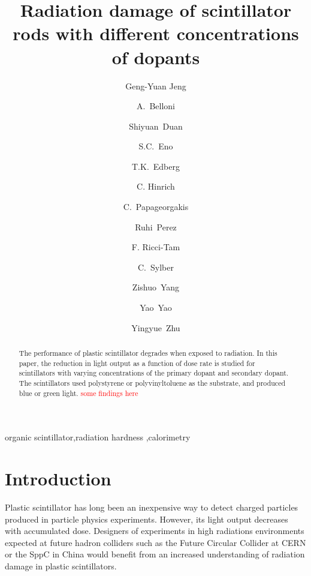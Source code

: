 \documentclass[review]{elsarticle}
\begin{document}
\begin{frontmatter}

\title{Radiation damage of scintillator rods with different concentrations of dopants
}


\author[umd]{Geng-Yuan Jeng}
\author[umd]{A.~Belloni}
\author[umd]{Shiyuan~Duan}
\author[umd]{S.C.~Eno}
\author[umd]{T.K.~Edberg}
\author[umd]{C. Hinrich}
\author[umd]{C.~Papageorgakis}
\author[umd]{Ruhi~Perez}
\author[umd]{F. Ricci-Tam}
\author[umd]{C.~Sylber}
\author[umd]{Zishuo~Yang}
\author[umd]{Yao~Yao}
\author[umd]{Yingyue~Zhu}

\address[umd]{Dept. Physics, U. Maryland, College Park MD 30742 USA}



\begin{abstract}
The performance of plastic scintillator degrades when exposed to radiation. 
In this paper, the reduction in light output  as a function of dose rate
is studied for scintillators
with varying concentrations of the primary dopant and secondary dopant.
The scintillators used polystyrene or polyvinyltoluene as the substrate, and
produced blue or green light. \textcolor{red}{some findings here}
\end{abstract}

\begin{keyword}
organic scintillator\sep radiation hardness \sep calorimetry
\end{keyword}

\end{frontmatter}

\linenumbers

\section{Introduction}
Plastic scintillator has long been an inexpensive way to detect 
charged particles produced in particle physics experiments.  
However, its 
light output decreases with accumulated dose.  
Designers of experiments in high radiations environments expected
at future hadron colliders such as the Future Circular Collider at CERN\cite{fcc}
or the SppC in China\cite{sppc}
would benefit from an increased understanding
of radiation damage in plastic scintillators.
\end{document}
